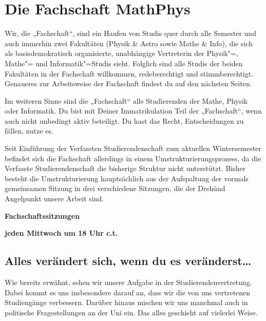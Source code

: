\section{Die Fachschaft MathPhys}
Wir, die „Fachschaft“, sind ein Haufen von Studis quer durch alle Semester und auch immerhin zwei Fakultäten (Physik \& Astro sowie Mathe \& Info), die sich als basisdemokratisch organisierte, unabhängige Vertreterin der Physik"=, Mathe"= und Informatik"=Studis sieht. Folglich sind alle Studis der beiden Fakultäten in der Fachschaft willkommen, redeberechtigt und stimmberechtigt. Genaueres zur Arbeitsweise der Fachschaft findest du auf den nächsten Seiten.

Im weiteren Sinne sind die „Fachschaft“ alle Studierenden der Mathe, Physik oder Informatik. Du bist mit Deiner Immatrikulation Teil der „Fachschaft“, wenn auch nicht unbedingt aktiv beteiligt. Du hast das Recht, Entscheidungen zu fällen, nutze es.

Seit Einführung der Verfassten Studierendenschaft zum aktuellen Wintersemester befindet sich die Fachschaft allerdings in einem Umstrukturierungsprozess, da die Verfasste Studierendenschaft die bisherige Struktur nicht unterstützt. Bisher besteht die Umstrukturierung hauptsächlich aus der Aufspaltung der vormals gemeinsamen Sitzung in drei verschiedene Sitzungen, die der Dreh\= und Angelpunkt unsere Arbeit sind.

\begin{center}
\large
\textbf{Fachschaftssitzungen}

\textbf{jeden Mittwoch um 18 Uhr \gls{c.t.}}
\end{center}


\subsection*{Alles verändert sich, wenn du es veränderst\dots}
Wie bereits erwähnt, sehen wir unsere Aufgabe in der Studierendenvertretung. Dabei kommt es uns insbesondere darauf an, dass wir die von uns vertretenen Studiengänge verbessern. Darüber hinaus mischen wir uns manchmal auch in politische Fragestellungen an der Uni ein. Das alles geschieht auf vielerlei Weise.

